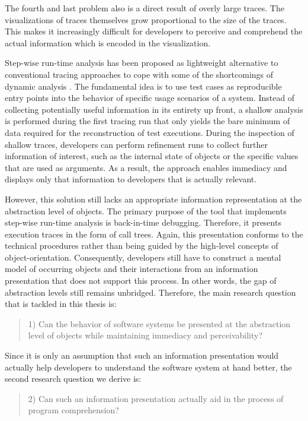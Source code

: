 The fourth and last problem also is a direct result of overly large traces.
The visualizations of traces themselves grow proportional to the size of the traces.
This makes it increasingly difficult for developers to perceive and comprehend the actual information which is encoded in the visualization.

Step-wise run-time analysis has been proposed as lightweight alternative to conventional tracing approaches to cope with some of the shortcomings of dynamic analysis  \cite{perscheid_immediacy_2010}.
The fundamental idea is to use test cases as reproducible entry points into the behavior of specific usage scenarios of a system.
Instead of collecting potentially useful information in its entirety up front, a shallow analysis is performed during the first tracing run that only yields the bare minimum of data required for the reconstruction of test executions.
During the inspection of shallow traces, developers can perform refinement runs to collect further information of interest, such as the internal state of objects or the specific values that are used as arguments.
As a result, the approach enables immediacy and displays only that information to developers that is actually relevant.

However, this solution still lacks an appropriate information representation at the abstraction level of objects.
The primary purpose of the tool that implements step-wise run-time analysis is back-in-time debugging.
Therefore, it presents execution traces in the form of call trees.
Again, this presentation conforms to the technical procedures rather than being guided by the high-level concepts of object-orientation.
Consequently, developers still have to construct a mental model of occurring objects and their interactions from an information presentation that does not support this process.
In other words, the gap of abstraction levels still remains unbridged.
Therefore, the main research question that is tackled in this thesis is:

\begin{quote}
1) Can the behavior of software systems be presented at the abstraction level of objects while maintaining immediacy and perceivability?
\end{quote}

Since it is only an assumption that such an information presentation would actually help developers to understand the software system at hand better, the second research question we derive is:

\begin{quote}
2) Can such an information presentation actually aid in the process of program comprehension?
\end{quote}

